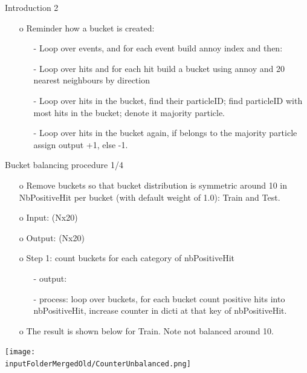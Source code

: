 \documentclass{beamer}
\begin{document}
\begin{frame}{Introduction 2}
\begin{enumerate}
\item[o] Reminder how a bucket is created:
\begin{enumerate}
\item[-] Loop over events, and for each event build annoy index and then:
\item[-] Loop over hits and for each hit build a bucket using annoy and 20 nearest neighbours by direction
\item[-] Loop over hits in the bucket, find their particleID; find particleID with most hits in the bucket; denote it majority particle.
\item[-] Loop over hits in the bucket again, if belongs to the majority particle assign output +1, else -1.
\end{enumerate}
\end{enumerate}
\end{frame}
\clearpage

\begin{frame}{Bucket balancing procedure 1/4}
\begin{enumerate}
\item[o] Remove buckets so that bucket distribution is symmetric around 10 in NbPositiveHit per bucket (with default weight of 1.0): Train and Test.
\item[o] Input: \texttt{} (Nx20)
\item[o] Output: \texttt{} (Nx20)
\item[o] Step 1: count buckets for each category of nbPositiveHit
\begin{enumerate}
\item[-] output: \texttt{}
\item[-] process: loop over buckets, for each bucket count positive hits into nbPositiveHit, increase counter in dicti at that key of nbPositiveHit.
\end{enumerate}
\item[o] The result is shown below for Train. Note not balanced around 10. 
\end{enumerate}
\centering
\texttt{[image: \\inputFolderMergedOld/CounterUnbalanced.png]}
\end{frame}
\end{document}
